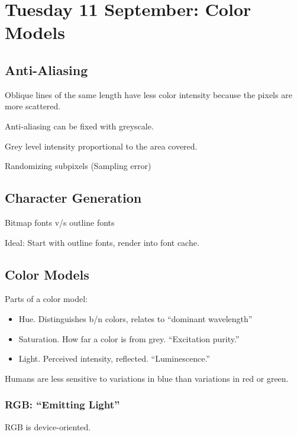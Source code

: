 \section{Tuesday 11 September:  Color Models}

\subsection{Anti-Aliasing}

Oblique lines of the same length have less color intensity because the pixels are more scattered.  

Anti-aliasing can be fixed with greyscale.

Grey level intensity proportional to the area covered.  

Randomizing subpixels (Sampling error)

\subsection{Character Generation}

Bitmap fonts v/s outline fonts

Ideal:  Start with outline fonts, render into font cache.  

\subsection{Color Models}

Parts of a color model:

\begin{itemize}
	\item Hue.  Distinguishes b/n colors, relates to ``dominant wavelength''
	\item Saturation.  How far a color is from grey.  ``Excitation purity.''
	\item Light.  Perceived intensity, reflected.  ``Luminescence.''
\end{itemize}

Humans are less sensitive to variations in blue than variations in red or green.  

\subsubsection{RGB:  ``Emitting Light''}

RGB is device-oriented.  

\


